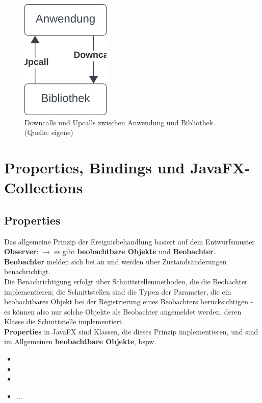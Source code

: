 \begin{figure}
    \centering
    \includegraphics[scale=0.5]{chapters/fopt3/img/javafx/downcallupcall}
    \caption{Downcalls und Upcalls zwischen Anwendung und Bibliothek. (Quelle: eigene)}
    \label{fig:downcallupcall}
\end{figure}

\section{Properties, Bindings und JavaFX-Collections}

\subsection{Properties}

Das allgemeine Prinzip der Ereignisbehandlung basiert auf dem Entwurfsmuster \textbf{Observer}: $\rightarrow$ es gibt \textbf{beobachtbare Objekte} und \textbf{Beobachter}.\\

\noindent
\textbf{Beobachter} melden sich bei  an und werden über Zustandsänderungen benachrichtigt.\\

\noindent
Die Benachrichtigung erfolgt über Schnittstellenmethoden, die die Beobachter implementieren; die Schnittstellen sind die Typen der Parameter, die ein beobachtbares Objekt bei der Registrierung eines Beobachters berücksichtigen - es können also nur solche Objekte als Beobachter angemeldet werden, deren Klasse die Schnittstelle implementiert.\\

\noindent
\textbf{Properties} in JavaFX sind Klassen, die dieses Prinzip implementieren, und sind im Allgemeinen \textbf{beobachtbare Objekte}, bspw.

\begin{itemize}
    \item {}
    \item {}
    \item {}
    \item {...}
\end{itemize}


